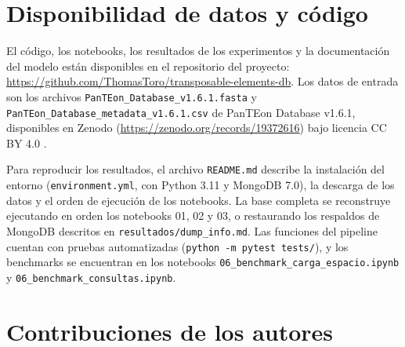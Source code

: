 \documentclass[unnumsec,namedate,webpdf,contemporary,large]{oup-authoring-template}
\begin{document}
\section{Disponibilidad de datos y c\'odigo}

El c\'odigo, los notebooks, los resultados de los experimentos y la documentaci\'on del modelo est\'an disponibles en el repositorio del proyecto: \url{https://github.com/ThomasToro/transposable-elements-db}. Los datos de entrada son los archivos \texttt{PanTEon\_\allowbreak Database\_\allowbreak v1.6.1.fasta} y \texttt{PanTEon\_\allowbreak Database\_\allowbreak metadata\_\allowbreak v1.6.1.csv} de PanTEon Database v1.6.1, disponibles en Zenodo (\url{https://zenodo.org/records/19372616}) bajo licencia CC BY 4.0 \citep{panteon2026database}.

Para reproducir los resultados, el archivo \texttt{README.md} describe la instalaci\'on del entorno (\texttt{environment.yml}, con Python 3.11 y MongoDB 7.0), la descarga de los datos y el orden de ejecuci\'on de los notebooks. La base completa se reconstruye ejecutando en orden los notebooks 01, 02 y 03, o restaurando los respaldos de MongoDB descritos en \texttt{resultados/dump\_info.md}. Las funciones del pipeline cuentan con pruebas automatizadas (\texttt{python -m pytest tests/}), y los benchmarks se encuentran en los notebooks \texttt{06\_benchmark\_carga\_espacio.ipynb} y \texttt{06\_benchmark\_consultas.ipynb}.



\section{Contribuciones de los autores}
\end{document}
